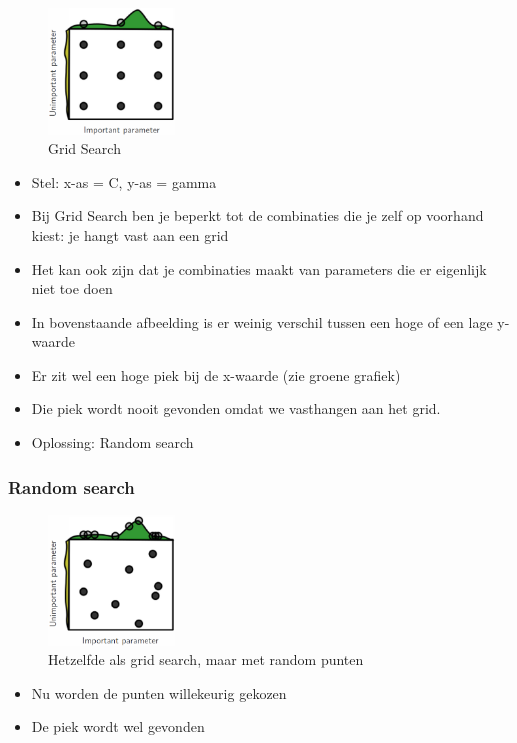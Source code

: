\documentclass{article}
\begin{document}
\begin{figure}[H]
    \centering
    \includegraphics[width=0.3\textwidth]{grid-search.png}
    \caption{Grid Search}
\end{figure}

\begin{itemize}
    \item Stel: x-as = C, y-as = gamma
    \item Bij Grid Search ben je beperkt tot de combinaties die je zelf op voorhand kiest: je hangt vast aan een grid
    \item Het kan ook zijn dat je combinaties maakt van parameters die er eigenlijk niet toe doen
    \item In bovenstaande afbeelding is er weinig verschil tussen een hoge of een lage y-waarde
    \item Er zit wel een hoge piek bij de x-waarde (zie groene grafiek)
    \item Die piek wordt nooit gevonden omdat we vasthangen aan het grid.
    \item Oplossing: Random search
\end{itemize}


\subsubsection{Random search}

\begin{figure}[H]
    \centering
    \includegraphics[width=0.3\textwidth]{random-search.png}
    \caption{Hetzelfde als grid search, maar met random punten}
\end{figure}

\begin{itemize}
    \item Nu worden de punten willekeurig gekozen
    \item De piek wordt wel gevonden
\end{itemize}
\end{document}

